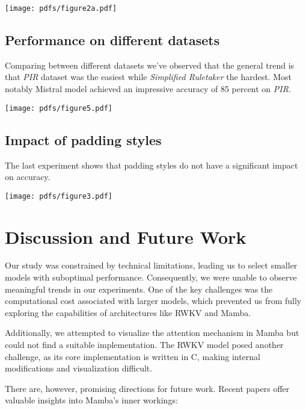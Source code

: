 \documentclass[11pt]{article}
\begin{document}
\texttt{[image: pdfs/figure2a.pdf]}

\subsection{Performance on different datasets}

Comparing between different datasets we've observed that the general trend is that \textit{PIR} dataset was the easiest while \textit{Simplified Ruletaker} the hardest. Most notably Mistral model achieved an impressive accuracy of 85 percent on \textit{PIR}.

\texttt{[image: pdfs/figure5.pdf]}

\subsection{Impact of padding styles}

The last experiment shows that padding styles do not have a significant impact on accuracy.

\texttt{[image: pdfs/figure3.pdf]}


\section{Discussion and Future Work}

Our study was constrained by technical limitations, leading us to select smaller models with suboptimal performance. Consequently, we were unable to observe meaningful trends in our experiments. One of the key challenges was the computational cost associated with larger models, which prevented us from fully exploring the capabilities of architectures like RWKV and Mamba.

Additionally, we attempted to visualize the attention mechanism in Mamba but could not find a suitable implementation. The RWKV model posed another challenge, as its core implementation is written in C, making internal modifications and visualization difficult. 

There are, however, promising directions for future work. Recent papers offer valuable insights into Mamba's inner workings:
\end{document}
